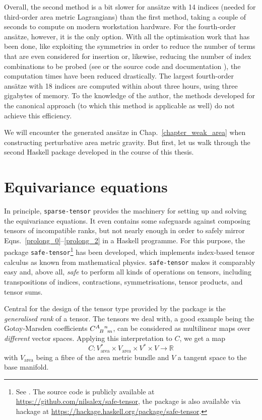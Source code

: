 Overall, the second method is a bit slower for ansätze with 14 indices (needed for third-order area metric Lagrangians) than the first method, taking a couple of seconds to compute on modern workstation hardware. For the fourth-order ansätze, however, it is the only option. With all the optimisation work that has been done, like exploiting the symmetries in order to reduce the number of terms that are even considered for insertion or, likewise, reducing the number of index combinations to be probed (see \cite{Reinhart_2019} or the source code and documentation \cite{Reinhart_2019_sparse-tensor}), the computation times have been reduced drastically. The largest fourth-order ansätze with 18 indices are computed within about three hours, using three gigabytes of memory. To the knowledge of the author, the methods developed for the canonical approach \cite{Schneider_2017} (to which this method is applicable as well) do not achieve this efficiency.

We will encounter the generated ansätze in Chap.~\ref{chapter_weak_area} when constructing perturbative area metric gravity. But first, let us walk through the second Haskell package developed in the course of this thesis.

\section{Equivariance equations}\label{sect_safe-tensor}
In principle, \texttt{sparse-tensor} provides the machinery for setting up and solving the equivariance equations. It even contains some safeguards against composing tensors of incompatible ranks, but not nearly enough in order to safely mirror Eqns.\ \eqref{prolong_0}--\eqref{prolong_2} in a Haskell programme. For this purpose, the package \texttt{safe-tensor}\footnote{See \cite{Alex_2020_safe-tensor}. The source code is publicly available at \url{https://github.com/nilsalex/safe-tensor}, the package is also available via hackage at \url{https://hackage.haskell.org/package/safe-tensor}.} has been developed, which implements index-based tensor calculus as known from mathematical physics. \texttt{safe-tensor} makes it comparably easy and, above all, \emph{safe} to perform all kinds of operations on tensors, including transpositions of indices, contractions, symmetrisations, tensor products, and tensor sums.

Central for the design of the tensor type provided by the package is the \emph{generalised rank} of a tensor. The tensors we deal with, a good example being the Gotay-Marsden coefficients $\gmc{A}{B}{n}{m}$, can be considered as multilinear maps over \emph{different} vector spaces. Applying this interpretation to $C$, we get a map
\begin{equation}
  C \colon V_\text{area}^\ast \times V_\text{area} \times V^\ast \times V \rightarrow \mathbb R
\end{equation}
with $V_\text{area}$ being a fibre of the area metric bundle and $V$ a tangent space to the base manifold.

